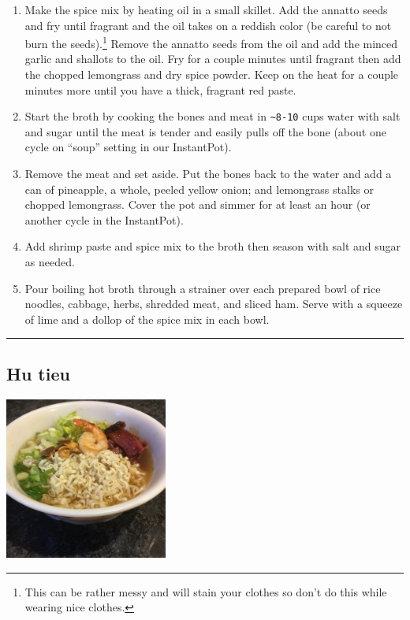 \documentclass[
]{book}
\begin{document}
\begin{enumerate}
\def\labelenumi{\arabic{enumi}.}
\item
  Make the spice mix by heating oil in a small skillet. Add the annatto seeds and fry until fragrant and the oil takes on a reddish color (be careful to not burn the seeds).\footnote{This can be rather messy and will stain your clothes so don't do this while wearing nice clothes.} Remove the annatto seeds from the oil and add the minced garlic and shallots to the oil. Fry for a couple minutes until fragrant then add the chopped lemongrass and dry spice powder. Keep on the heat for a couple minutes more until you have a thick, fragrant red paste.
\item
  Start the broth by cooking the bones and meat in \texttt{\textasciitilde{}8-10} cups water with salt and sugar until the meat is tender and easily pulls off the bone (about one cycle on ``soup'' setting in our InstantPot).
\item
  Remove the meat and set aside. Put the bones back to the water and add a can of pineapple, a whole, peeled yellow onion; and lemongrass stalks or chopped lemongrass. Cover the pot and simmer for at least an hour (or another cycle in the InstantPot).
\item
  Add shrimp paste and spice mix to the broth then season with salt and sugar as needed.
\item
  Pour boiling hot broth through a strainer over each prepared bowl of rice noodles, cabbage, herbs, shredded meat, and sliced ham. Serve with a squeeze of lime and a dollop of the spice mix in each bowl.
\end{enumerate}

\begin{center}\rule{0.5\linewidth}{0.5pt}\end{center}

\hypertarget{hutieu}{%
\subsection*{Hu tieu}\label{hutieu}}

\includegraphics[width=0.4\textwidth,height=\textheight]{hu_tieu_small.jpg}
\end{document}
